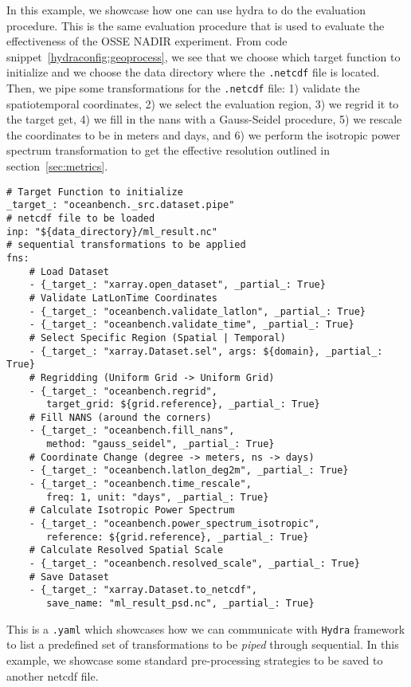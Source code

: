 In this example, we showcase how one can use hydra to do the evaluation procedure. This is the same evaluation procedure that is used to evaluate the effectiveness of the OSSE NADIR experiment. From code snippet~\ref{hydraconfig:geoprocess}, we see that we choose which target function to initialize and we choose the data directory where the \texttt{.netcdf} file is located. Then, we pipe some transformations for the \texttt{.netcdf} file: 1) validate the spatiotemporal coordinates, 2) we select the evaluation region, 3) we regrid it to the target get, 4) we fill in the nans with a Gauss-Seidel procedure, 5) we rescale the coordinates to be in meters and days, and 6) we perform the isotropic power spectrum transformation to get the effective resolution outlined in section~\ref{sec:metrics}.

\begin{listing}[ht!]
\begin{verbatim}
# Target Function to initialize
_target_: "oceanbench._src.dataset.pipe"
# netcdf file to be loaded
inp: "${data_directory}/ml_result.nc"
# sequential transformations to be applied
fns:
    # Load Dataset
    - {_target_: "xarray.open_dataset", _partial_: True}
    # Validate LatLonTime Coordinates
    - {_target_: "oceanbench.validate_latlon", _partial_: True}
    - {_target_: "oceanbench.validate_time", _partial_: True}
    # Select Specific Region (Spatial | Temporal)
    - {_target_: "xarray.Dataset.sel", args: ${domain}, _partial_: True}
    # Regridding (Uniform Grid -> Uniform Grid)
    - {_target_: "oceanbench.regrid", 
       target_grid: ${grid.reference}, _partial_: True}
    # Fill NANS (around the corners)
    - {_target_: "oceanbench.fill_nans", 
       method: "gauss_seidel", _partial_: True}
    # Coordinate Change (degree -> meters, ns -> days)
    - {_target_: "oceanbench.latlon_deg2m", _partial_: True}
    - {_target_: "oceanbench.time_rescale", 
       freq: 1, unit: "days", _partial_: True}
    # Calculate Isotropic Power Spectrum
    - {_target_: "oceanbench.power_spectrum_isotropic", 
       reference: ${grid.reference}, _partial_: True}
    # Calculate Resolved Spatial Scale
    - {_target_: "oceanbench.resolved_scale", _partial_: True}
    # Save Dataset
    - {_target_: "xarray.Dataset.to_netcdf", 
       save_name: "ml_result_psd.nc", _partial_: True}
\end{verbatim}


\label{hydraconfig:evaluation}
\caption{This is a \texttt{.yaml} which showcases how we can communicate with \texttt{Hydra} framework to list a predefined set of transformations to be \textit{piped} through sequential. In this example, we showcase some standard pre-processing strategies to be saved to another netcdf file.}
\end{listing}




